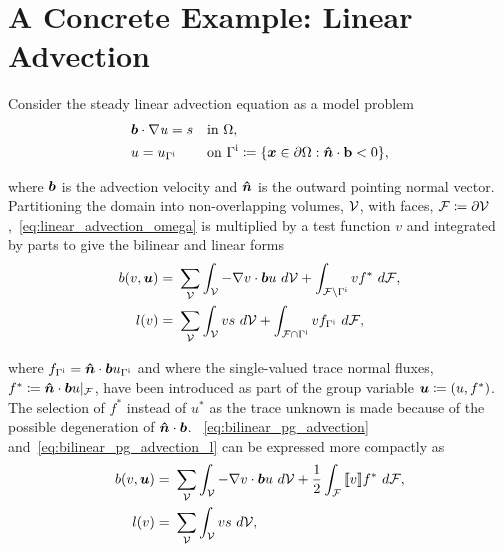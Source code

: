 \section{A Concrete Example: Linear Advection}

Consider the steady linear advection equation as a model problem
\begin{subequations}
\begin{align}
& \varv{b} \cdot \nabla \vars{u} = s && \text{in}\ \Omega, \label{eq:linear_advection_omega} \\
& u = u_{\Gamma^{\text{i}}}\ && \text{on}\ \Gamma^{\text{i}} \coloneqq \{ \varv{x} \in \partial\Omega : \varv{\hat{n}} \cdot \vect{b} < 0 \},
\end{align}
\end{subequations}

where $\mathit{\bm{{b}}}$ is the advection velocity and $\mathit{\bm{{\hat{n}}}}$ is the outward pointing normal vector. Partitioning the
domain into non-overlapping volumes, $\mathcal{{{V}}}$, with faces, $\mathcal{{{F}}} \coloneqq \partial
\mathcal{{{V}}}$,~\eqref{eq:linear_advection_omega} is multiplied by a test function $v$ and integrated by parts to give the
bilinear and linear forms
\begin{subequations} \label{eq:variational_form_advection}
\begin{align}
b(v,\varg{u}) 
=\ & \sum_{\fe{V}}
\int_{\fe{V}} - \nabla v \cdot \varv{b} u\ d\fe{V} +
\int_{\fe{F} \setminus \Gamma^{\text{i}}} v f^*\ d\fe{F}, \label{eq:bilinear_pg_advection} \\
l(v)
=\ & \sum_{\fe{V}} \int_{\fe{V}} v s\ d\fe{V} + \int_{\fe{F} \cap \Gamma^{\text{i}}} v f_{\Gamma^{\text{i}}}\ d\fe{F},
\label{eq:bilinear_pg_advection_l}
\end{align}
\end{subequations}

where $f_{\Gamma^{\text{i}}} = \mathit{\bm{{\hat{n}}}} \cdot \mathit{\bm{{b}}} u_{\Gamma^{\text{i}}}$ and where the single-valued trace
normal fluxes, $f^* \coloneqq \mathit{\bm{{\hat{n}}}} \cdot \mathit{\bm{{b}}} u|_{\mathcal{{{F}}}}$, have been introduced as part of the group
variable $\mathit{\bm{{u}}} \coloneqq (u,f^*)$. The selection of $f^*$ instead of $u^*$ as the trace unknown is made because of
the possible degeneration of $\mathit{\bm{{\hat{n}}}} \cdot \mathit{\bm{{b}}}$. ~\eqref{eq:bilinear_pg_advection}
and~\eqref{eq:bilinear_pg_advection_l} can be expressed more
compactly as
\begin{align} \label{eq:bilinear_pg_advection_jump}
b(v,\varg{u}) 
=\ & \sum_{\fe{V}} \int_{\fe{V}} - \nabla v \cdot \varv{b} u\ d\fe{V}
+ \frac{1}{2} \int_{\fe{F}} \jump{v} f^*\ d\fe{F}, \\
l(v)
=\ & \sum_{\fe{V}} \int_{\fe{V}} v s\ d\fe{V},
\end{align}

